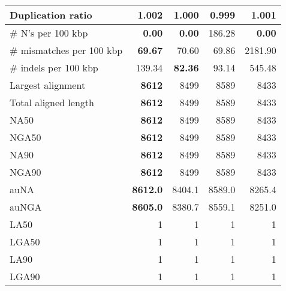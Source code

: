 \documentclass[12pt,a4paper]{article}
\begin{document}
\begin{table}[ht]
\begin{center}
\begin{tabular}{|l*{4}{|r}|}
Duplication ratio & 1.002 & 1.000 & {\bf 0.999} & 1.001 \\ \hline
\# N's per 100 kbp & {\bf 0.00} & {\bf 0.00} & 186.28 & {\bf 0.00} \\ \hline
\# mismatches per 100 kbp & {\bf 69.67} & 70.60 & 69.86 & 2181.90 \\ \hline
\# indels per 100 kbp & 139.34 & {\bf 82.36} & 93.14 & 545.48 \\ \hline
Largest alignment & {\bf 8612} & 8499 & 8589 & 8433 \\ \hline
Total aligned length & {\bf 8612} & 8499 & 8589 & 8433 \\ \hline
NA50 & {\bf 8612} & 8499 & 8589 & 8433 \\ \hline
NGA50 & {\bf 8612} & 8499 & 8589 & 8433 \\ \hline
NA90 & {\bf 8612} & 8499 & 8589 & 8433 \\ \hline
NGA90 & {\bf 8612} & 8499 & 8589 & 8433 \\ \hline
auNA & {\bf 8612.0} & 8404.1 & 8589.0 & 8265.4 \\ \hline
auNGA & {\bf 8605.0} & 8380.7 & 8559.1 & 8251.0 \\ \hline
LA50 & 1 & 1 & 1 & 1 \\ \hline
LGA50 & 1 & 1 & 1 & 1 \\ \hline
LA90 & 1 & 1 & 1 & 1 \\ \hline
LGA90 & 1 & 1 & 1 & 1 \\ \hline
\end{tabular}
\end{center}
\end{table}
\end{document}
